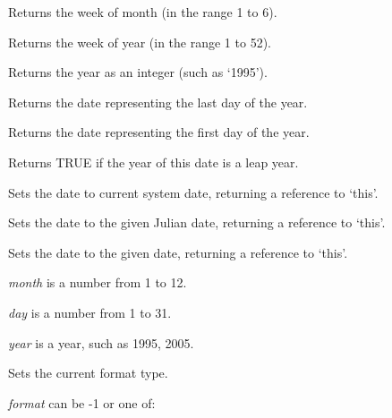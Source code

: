Returns the week of month (in the range 1 to 6).



Returns the week of year (in the range 1 to 52).


 

Returns the year as an integer (such as `1995').



Returns the date representing the last day of the year.



Returns the date representing the first day of the year.


 

Returns TRUE if the year of this date is a leap year.



Sets the date to current system date, returning a reference to `this'.


Sets the date to the given Julian date, returning a reference to `this'.


Sets the date to the given date, returning a reference to `this'.

{\it month} is a number from 1 to 12.

{\it day} is a number from 1 to 31.

{\it year} is a year, such as 1995, 2005.



Sets the current format type.

{\it format} can be -1 or one of:

\begin{twocollist}\itemsep=0pt
\end{twocollist}

